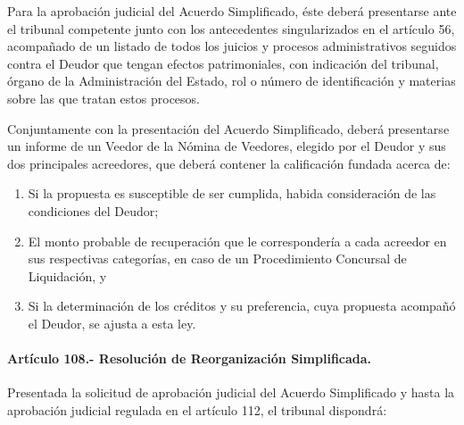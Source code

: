 \documentclass[
]{book}
\begin{document}
Para la aprobación judicial del Acuerdo Simplificado, éste deberá presentarse ante el tribunal competente junto con los antecedentes singularizados en el artículo 56, acompañado de un listado de todos los juicios y procesos administrativos seguidos contra el Deudor que tengan efectos patrimoniales, con indicación del tribunal, órgano de la Administración del Estado, rol o número de identificación y materias sobre las que tratan estos procesos.

Conjuntamente con la presentación del Acuerdo Simplificado, deberá presentarse un informe de un Veedor de la Nómina de Veedores, elegido por el Deudor y sus dos principales acreedores, que deberá contener la calificación fundada acerca de:

\begin{enumerate}
\def\labelenumi{\arabic{enumi}.}
\item
  Si la propuesta es susceptible de ser cumplida, habida consideración de las condiciones del Deudor;
\item
  El monto probable de recuperación que le correspondería a cada acreedor en sus respectivas categorías, en caso de un Procedimiento Concursal de Liquidación, y
\item
  Si la determinación de los créditos y su preferencia, cuya propuesta acompañó el Deudor, se ajusta a esta ley.
\end{enumerate}

\hypertarget{artuxedculo-108.--resoluciuxf3n-de-reorganizaciuxf3n-simplificada.}{%
\paragraph*{Artículo 108.- Resolución de Reorganización Simplificada.}\label{artuxedculo-108.--resoluciuxf3n-de-reorganizaciuxf3n-simplificada.}}

Presentada la solicitud de aprobación judicial del Acuerdo Simplificado y hasta la aprobación judicial regulada en el artículo 112, el tribunal dispondrá:
\end{document}
